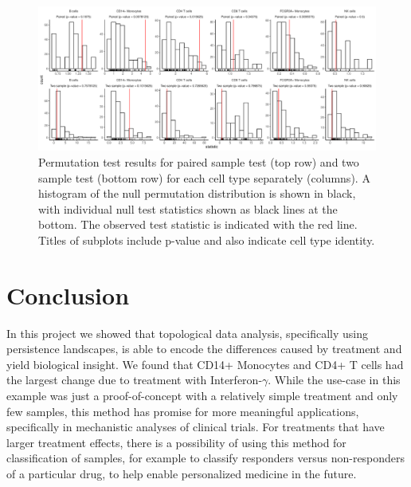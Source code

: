 \documentclass[11pt]{article}
\begin{document}
\begin{figure}[!htb]
    \centering
	\includegraphics[width=16cm]{results/combined_permutation_test.pdf}
    \caption{Permutation test results for paired sample test (top row) and two sample test (bottom row) for each cell type separately (columns). A histogram of the null permutation distribution is shown in black, with individual null test statistics shown as black lines at the bottom. The observed test statistic is indicated with the red line. Titles of subplots include p-value and also indicate cell type identity.}
\end{figure}

\section{Conclusion}

In this project we showed that topological data analysis, specifically using persistence landscapes, is able to encode the differences caused by treatment and yield biological insight. We found that CD14+ Monocytes and CD4+ T cells had the largest change due to treatment with Interferon-$\gamma$. While the use-case in this example was just a proof-of-concept with a relatively simple treatment and only few samples, this method has promise for more meaningful applications, specifically in mechanistic analyses of clinical trials. For treatments that have larger treatment effects, there is a possibility of using this method for classification of samples, for example to classify responders versus non-responders of a particular drug, to help enable personalized medicine in the future. 
\end{document}
